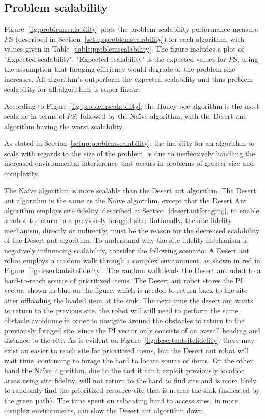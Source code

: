 
\subsection{Problem scalability}
\label{results:problemscalability}

Figure~\ref{fig:problemscalability} plots the problem scalability performance measure $PS$ (described in Section~\ref{setup:problemscalability}) for each algorithm, with values given in Table~\ref{table:problemscalability}. The figure includes a plot of "Expected scalability". "Expected scalability" is the expected values for $PS$, using the assumption that foraging efficiency would degrade as the problem size increases. All algorithm's outperform the expected scalability and thus problem scalability for all algorithms is super-linear.

According to Figure~\ref{fig:problemscalability}, the Honey bee algorithm is the most scalable in terms of $PS$, followed by the Na\"ive algorithm, with the Desert ant algorithm having the worst scalability. %

As stated in Section~\ref{setup:problemscalability}, the inability for an algorithm to scale with regards to the size of the problem, is due to ineffectively handling the increased environmental interference that occurs in problems of greater size and complexity.

The Na\"ive algorithm is more scalable than the Desert ant algorithm. The Desert ant algorithm is the same as the Na\"ive algorithm, except that the Desert Ant algorithm employs site fidelity, described in Section~\ref{desertantforaging}, to enable a robot to return to a previously foraged site. Rationally, the site fidelity mechanism, directly or indirectly, must be the reason for the decreased scalability of the Desert ant algorithm. To understand why the site fidelity mechanism is negatively influencing scalability, consider the following scenario: A Desert ant robot employs a random walk through a complex environment, as shown in red in Figure~\ref{fig:desertantsitefidelity}. The random walk leads the Desert ant robot to a hard-to-reach source of prioritized items. The Desert ant robot stores the PI vector, shown in blue on the figure, which is needed to return back to the site after offloading the loaded item at the sink. The next time the desert ant wants to return to the previous site, the robot will still need to perform the same obstacle avoidance in order to navigate around the obstacles to return to the previously foraged site, since the PI vector only consists of an overall heading and distance to the site. As is evident on Figure~\ref{fig:desertantsitefidelity}, there may exist an easier to reach site for prioritized items, but the Desert ant robot will wait time, continuing to forage the hard to locate source of items. On the other hand the Na\"ive algorithm, due to the fact it can't exploit previously location areas using site fidelity, will not return to the hard to find site and is more likely to randomly find the prioritized resource site that is nearer the sink (indicated by the green path). The time spent on relocating hard to access sites, in more complex environments, can slow the Desert ant algorithm down.


